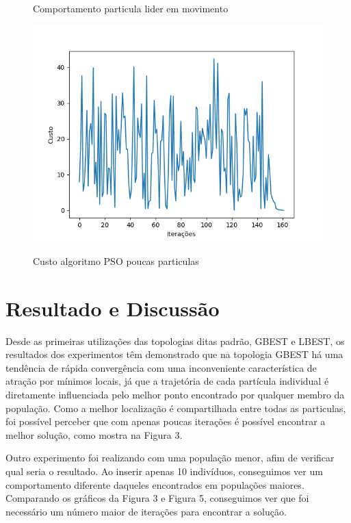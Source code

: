 \documentclass[conference]{IEEEtran}
\begin{document}
\begin{figure}[htbp]
\begin{center}
    \caption{Comportamento particula lider em movimento} \label{gdimotes}
    \includegraphics[scale=0.5]{imagens-pso/particle-swarm-optimization-leader-moving-cost.png}
    \caption{Custo algoritmo PSO poucas particulas} \label{gdimotes}
    \end{center}
    \end{figure}

\vspace*{1cm}
\section{Resultado e Discussão}

    Desde as primeiras utilizações das topologias ditas padrão, GBEST e LBEST, os resultados dos experimentos têm demonstrado que na topologia GBEST há uma tendência de rápida convergência com uma inconveniente característica de atração por mínimos locais, já que a trajetória de cada partícula individual é diretamente influenciada pelo melhor ponto encontrado por qualquer membro da população. Como a melhor localização é compartilhada entre todas as particulas, foi possível perceber que com apenas poucas iterações é possível encontrar a melhor solução, como mostra na Figura 3.
    
    Outro experimento foi realizando com uma população menor, afim de verificar qual seria o resultado. Ao inserir apenas 10 indivíduos, conseguimos ver um comportamento diferente daqueles encontrados em populações maiores. Comparando os gráficos da Figura 3 e Figura 5, conseguimos ver que foi necessário um número maior de iterações para encontrar a solução.
    
\end{document}
